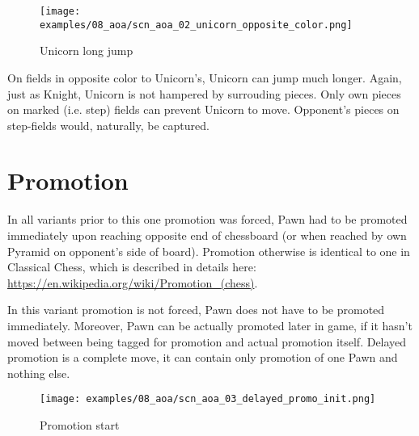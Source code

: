 \clearpage %

\noindent
\begin{figure}[!h]
\texttt{[image: examples/08\_aoa/scn\_aoa\_02\_unicorn\_opposite\_color.png]}
\caption{Unicorn long jump}
\label{fig:scn_aoa_02_unicorn_opposite_color}
\end{figure}

On fields in opposite color to Unicorn's, Unicorn can jump much longer.
Again, just as Knight, Unicorn is not hampered by surrouding pieces.
Only own pieces on marked (i.e. step) fields can prevent Unicorn to move.
Opponent's pieces on step-fields would, naturally, be captured.

\clearpage %

\section*{Promotion}

In all variants prior to this one promotion was forced, Pawn had to be
promoted immediately upon reaching opposite end of chessboard (or when
reached by own Pyramid on opponent's side of board). Promotion otherwise
is identical to one in Classical Chess, which is described in details here: \\
\href{https://en.wikipedia.org/wiki/Promotion\_(chess)}{https://en.wikipedia.org/wiki/Promotion\_(chess)}.

In this variant promotion is not forced, Pawn does not have to be promoted
immediately. Moreover, Pawn can be actually promoted later in game, if it
hasn't moved between being tagged for promotion and actual promotion itself.
Delayed promotion is a complete move, it can contain only promotion of one
Pawn and nothing else.

\clearpage %

\noindent
\begin{figure}[h]
\texttt{[image: examples/08\_aoa/scn\_aoa\_03\_delayed\_promo\_init.png]}
\caption{Promotion start}
\label{fig:scn_aoa_03_delayed_promo_init}
\end{figure}

